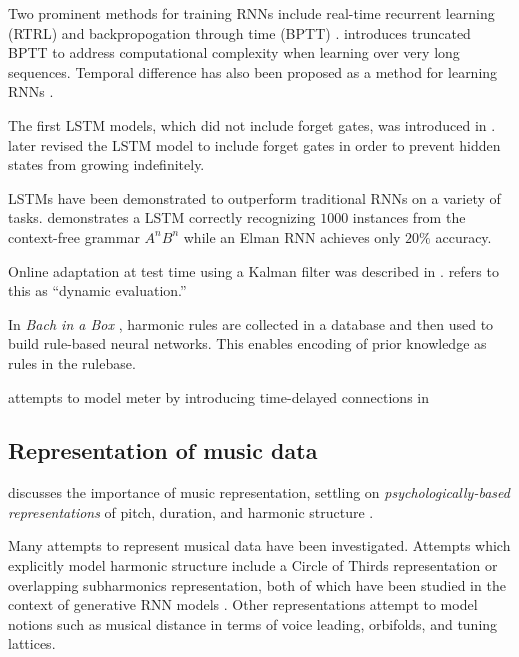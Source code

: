 \documentclass[dissertation.tex]{subfile}
\begin{document}
Two prominent methods for training RNNs include real-time recurrent learning (RTRL)
\cite{robinson1987utility} and backpropogation through time (BPTT) \cite{williams1995gradient}.
\cite{williams1990efficient} introduces truncated BPTT to address computational complexity
when learning over very long sequences. Temporal difference \cite{sutton1998reinforcement} has
also been proposed as a method for learning RNNs \cite{franklin2004predicting}.

The first LSTM models, which did not include forget gates, was introduced in
\cite{hochreiter1997long}. \cite{gers2000learning} later revised the LSTM model
to include forget gates in order to prevent hidden states from growing
indefinitely.

LSTMs have been demonstrated to outperform traditional RNNs on a variety of
tasks. \cite{gers2001lstm} demonstrates a LSTM correctly recognizing $1000$
instances from the context-free grammar $A^n B^n$ while an Elman RNN achieves
only $20\%$ accuracy.

Online adaptation at test time using a Kalman filter was described in \cite{gers2002dekf}.
\cite{Mikolov2010} \cite{Mikolov2012} refers to this as ``dynamic evaluation.''

In \emph{Bach in a Box} \cite{spangler1998bach},
harmonic rules are collected in a database and then used to build rule-based
neural networks. This enables encoding of prior knowledge as rules in the
rulebase.

\cite{eck2008learning} attempts to model meter by introducing time-delayed
connections in \cite{Eck2002}

\subsection{Representation of music data}

\cite{mozer1994neural} 
discusses the importance of music representation, settling on
\emph{psychologically-based representations} of pitch, duration, and harmonic
structure \cite{shepard1982geometrical}.

Many attempts to represent musical data have been investigated. Attempts which
explicitly model harmonic structure include a Circle of Thirds representation
\cite{franklin2004recurrent} or overlapping subharmonics
representation\cite{laden1989representation}, both of which have been studied
in the context of generative RNN models \cite{franklin2004recurrent}
\cite{mozer1994neural}. Other representations attempt to model notions such as
musical distance in terms of voice leading, orbifolds, and tuning
lattices\cite{Tymoczko2009}.
\end{document}
